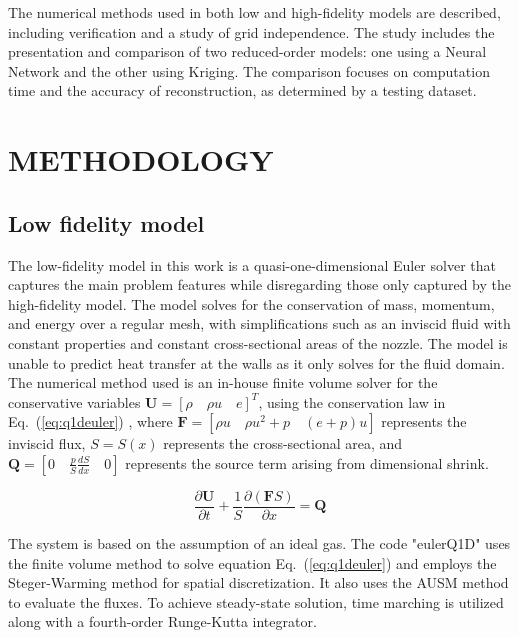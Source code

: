 \documentclass[10pt,fleqn,a4paper,twoside]{article}
\begin{document}
The numerical methods used in both low and high-fidelity models are described, including verification and a study of grid independence. The study includes the presentation and comparison of two reduced-order models: one using a Neural Network and the other using Kriging. The comparison focuses on computation time and the accuracy of reconstruction, as determined by a testing dataset.

\section{METHODOLOGY}

\subsection{Low fidelity model}

The low-fidelity model in this work is a quasi-one-dimensional Euler solver that captures the main problem features while disregarding those only captured by the high-fidelity model. The model solves for the conservation of mass, momentum, and energy over a regular mesh, with simplifications such as an inviscid fluid with constant properties and constant cross-sectional areas of the nozzle. The model is unable to predict heat transfer at the walls as it only solves for the fluid domain. The numerical method used is an in-house finite volume solver for the conservative variables $\mathbf{U} = \left[ \rho \quad \rho u \quad e \right]^T$, using the conservation law in Eq.~(\ref{eq:q1deuler}) \citep{Babu2020}, where $\mathbf{F} = \left[ \rho u \quad \rho u^2 + p \quad (e+p)u \right]$ represents the inviscid flux, $S=S(x)$ represents the cross-sectional area, and $\mathbf{Q} = \left[ 0 \quad \frac{p}{S}\frac{dS}{dx} \quad 0 \right]$ represents the source term arising from dimensional shrink.

\begin{equation}
\frac{\partial \mathbf{U}}{\partial t}+\frac{1}{S} \frac{\partial(\mathbf{F} S)}{\partial x}=\mathbf{Q}
\label{eq:q1deuler}
\end{equation}

The system is based on the assumption of an ideal gas. The code "eulerQ1D" uses the finite volume method to solve equation Eq.~(\ref{eq:q1deuler}) and employs the Steger-Warming method for spatial discretization. It also uses the AUSM method to evaluate the fluxes. To achieve steady-state solution, time marching is utilized along with a fourth-order Runge-Kutta integrator.
\end{document}
